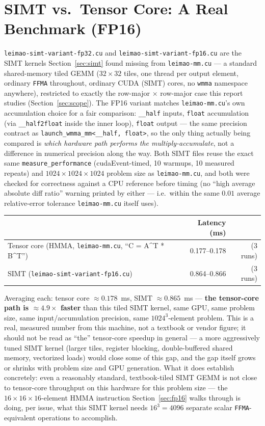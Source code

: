 \documentclass[11pt]{article}
\begin{document}
\section{SIMT vs.\ Tensor Core: A Real Benchmark (FP16)}
\label{sec:benchmark}

\texttt{leimao-simt-variant-fp32.cu} and \texttt{leimao-simt-variant-fp16.cu} are the SIMT
kernels Section~\ref{sec:simt} found missing from \texttt{leimao-mm.cu} --- a standard
shared-memory tiled GEMM ($32\times32$ tiles, one thread per output element, ordinary
\texttt{FFMA} throughout, ordinary CUDA (SIMT) cores, no \texttt{wmma} namespace
anywhere), restricted to exactly the row-major $\times$ row-major case this report
studies (Section~\ref{sec:scope}). The FP16 variant matches
\texttt{leimao-mm.cu}'s own accumulation choice for a fair comparison: \texttt{\_\_half}
inputs, \texttt{float} accumulation (via \texttt{\_\_half2float} inside the inner loop),
\texttt{float} output --- the same precision contract as
\texttt{launch\_wmma\_mm<\_\_half, float>}, so the only thing actually being compared is
\emph{which hardware path performs the multiply-accumulate}, not a difference in
numerical precision along the way. Both SIMT files reuse the exact same
\texttt{measure\_performance} (cudaEvent-timed, 10 warmups, 10 measured repeats) and
$1024\times1024\times1024$ problem size as \texttt{leimao-mm.cu}, and both were checked
for correctness against a CPU reference before timing (no ``high average absolute diff
ratio'' warning printed by either --- i.e.\ within the same $0.01$ average relative-error
tolerance \texttt{leimao-mm.cu} itself uses).

\begin{center}
\begin{tabular}{lrr}
\toprule
& Latency (ms) & \\
\midrule
Tensor core (HMMA, \texttt{leimao-mm.cu}, ``C = A\^{}T * B\^{}T'') & 0.177--0.178 & (3 runs) \\
SIMT (\texttt{leimao-simt-variant-fp16.cu}) & 0.864--0.866 & (3 runs) \\
\bottomrule
\end{tabular}
\end{center}

Averaging each: tensor core $\approx 0.178$~ms, SIMT $\approx 0.865$~ms ---
\textbf{the tensor-core path is $\approx\!4.9\times$ faster} than this tiled SIMT kernel,
same GPU, same problem size, same input/accumulation precision, same $1024^3$-element
problem. This is a real, measured number from this machine, not a textbook or vendor
figure; it should not be read as ``the'' tensor-core speedup in general --- a more
aggressively tuned SIMT kernel (larger tiles, register blocking, double-buffered shared
memory, vectorized loads) would close some of this gap, and the gap itself grows or
shrinks with problem size and GPU generation. What it does establish concretely: even a
reasonably standard, textbook-tiled SIMT GEMM is not close to tensor-core throughput on
this hardware for this problem size --- the $16\times16\times16$-element HMMA instruction
Section~\ref{sec:fp16} walks through is doing, per issue, what this SIMT kernel needs
$16^3 = 4096$ separate scalar \texttt{FFMA}-equivalent operations to accomplish.
\end{document}
